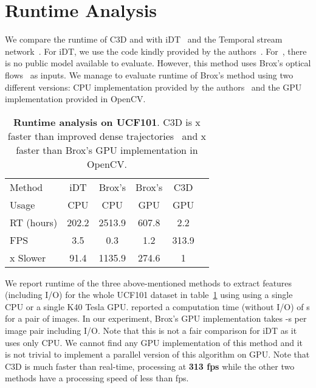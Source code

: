 \documentclass[10pt,twocolumn,letterpaper]{article}
\begin{document}
\section{Runtime Analysis}
\label{sec:runtime}

We compare the runtime of C3D and with iDT~\cite{Wang2013} and the Temporal stream network~\cite{SimonyanZ14}. For iDT, we use the code kindly provided by the authors~\cite{Wang2013}. For~\cite{SimonyanZ14}, there is no public model available to evaluate. However, this method uses Brox's optical flows~\cite{BroxM11} as inputs. We manage to evaluate runtime of Brox's method using two different versions: CPU implementation provided by the authors~\cite{BroxM11} and the GPU implementation provided in OpenCV.

\begin{table}
\begin{center}
{\small
\begin{tabular}{|l|c|c|c|c|c|}
\hline
Method & iDT & Brox's & Brox's & C3D \\
Usage & CPU & CPU & GPU & GPU \\
\hline
RT (hours) & 202.2 & 2513.9 & 607.8 & 2.2 \\
FPS & 3.5 & 0.3 & 1.2 & 313.9 \\
x Slower & 91.4 & 1135.9 & 274.6 & 1 \\
\hline
\end{tabular}
}
\end{center}
\vspace{-8pt}
\caption{{\bf Runtime analysis on UCF101}. C3D is x faster than improved dense trajectories~\cite{Wang2013} and x faster than Brox's GPU implementation in OpenCV.}
\vspace{-16pt}
\label{tab:runtime}
\end{table}

We report runtime of the three above-mentioned methods to extract features (including I/O) for the whole UCF101 dataset in table~\ref{tab:runtime} using using a single CPU or a single K40 Tesla GPU. \cite{SimonyanZ14} reported a computation time (without I/O) of s for a pair of images. In our experiment, Brox's GPU implementation takes -s per image pair including I/O. Note that this is not a fair comparison for iDT as it uses only CPU. We cannot find any GPU implementation of this method and it is not trivial to implement a parallel version of this algorithm on GPU. Note that C3D is much faster than real-time, processing at {\bf 313 fps} while the other two methods have a processing speed of less than  fps. 
\end{document}
